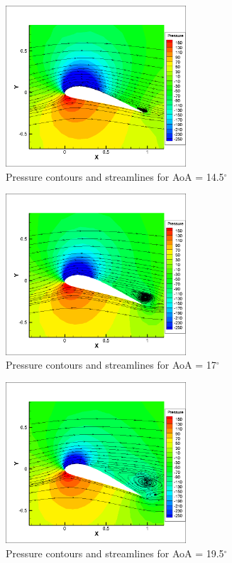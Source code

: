 \begin{figure}[H]
	\centering
	\includegraphics[width=0.6\textwidth]{tecplot_stuff/cont_stream_14_5.png}
	\caption{Pressure contours and streamlines for AoA = 14.5$^\circ$}
\label{fig:cont_stream_14_5}
\end{figure}

\begin{figure}[H]
	\centering
	\includegraphics[width=0.6\textwidth]{tecplot_stuff/cont_stream_17.png}
	\caption{Pressure contours and streamlines for AoA = 17$^\circ$}
\label{fig:cont_stream_17}
\end{figure}

\begin{figure}[H]
	\centering
	\includegraphics[width=0.6\textwidth]{tecplot_stuff/cont_stream_19_5.png}
	\caption{Pressure contours and streamlines for AoA = 19.5$^\circ$}
\label{fig:cont_stream_19_5}
\end{figure}

